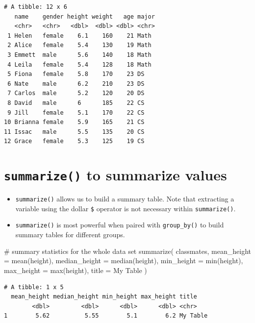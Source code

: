 \documentclass[
  letterpaper,
  DIV=11,
  numbers=noendperiod]{scrreprt}
\newenvironment{Shaded}{\begin{snugshade}}{\end{snugshade}}
\newcommand{\AttributeTok}[1]{\textcolor[rgb]{0.40,0.45,0.13}{#1}}
\newcommand{\CommentTok}[1]{\textcolor[rgb]{0.37,0.37,0.37}{#1}}
\newcommand{\FunctionTok}[1]{\textcolor[rgb]{0.28,0.35,0.67}{#1}}
\newcommand{\NormalTok}[1]{\textcolor[rgb]{0.00,0.23,0.31}{#1}}
\newcommand{\StringTok}[1]{\textcolor[rgb]{0.13,0.47,0.30}{#1}}
\begin{document}
\begin{tcolorbox}
\begin{verbatim}
# A tibble: 12 x 6
   name    gender height weight   age major
   <chr>   <chr>   <dbl>  <dbl> <dbl> <chr>
 1 Helen   female    6.1    160    21 Math 
 2 Alice   female    5.4    130    19 Math 
 3 Emmett  male      5.6    140    18 Math 
 4 Leila   female    5.4    128    18 Math 
 5 Fiona   female    5.8    170    23 DS   
 6 Nate    male      6.2    210    23 DS   
 7 Carlos  male      5.2    120    20 DS   
 8 David   male      6      185    22 CS   
 9 Jill    female    5.1    170    22 CS   
10 Brianna female    5.9    165    21 CS   
11 Issac   male      5.5    135    20 CS   
12 Grace   female    5.3    125    19 CS   
\end{verbatim}

\end{tcolorbox}

\section{\texorpdfstring{\texttt{summarize()} to summarize
values}{summarize() to summarize values}}\label{summarize-to-summarize-values}

\begin{itemize}
\item
  \texttt{summarize()} allows us to build a summary table. Note that
  extracting a variable using the dollar \texttt{\$} operator is not
  necessary within \texttt{summarize()}.
\item
  \texttt{summarize()} is most powerful when paired with
  \texttt{group\_by()} to build summary tables for different groups.
\end{itemize}

\begin{Shaded}
\begin{Highlighting}[]
\CommentTok{\# summary statistics for the whole data set}
\FunctionTok{summarize}\NormalTok{(}
\NormalTok{  classmates,}
  \AttributeTok{mean\_height =} \FunctionTok{mean}\NormalTok{(height),}
  \AttributeTok{median\_height =} \FunctionTok{median}\NormalTok{(height),}
  \AttributeTok{min\_height =} \FunctionTok{min}\NormalTok{(height),}
  \AttributeTok{max\_height =} \FunctionTok{max}\NormalTok{(height),}
  \AttributeTok{title =} \StringTok{\textquotesingle{}My Table\textquotesingle{}}
\NormalTok{)}
\end{Highlighting}
\end{Shaded}

\begin{verbatim}
# A tibble: 1 x 5
  mean_height median_height min_height max_height title   
        <dbl>         <dbl>      <dbl>      <dbl> <chr>   
1        5.62          5.55        5.1        6.2 My Table
\end{verbatim}
\end{document}
